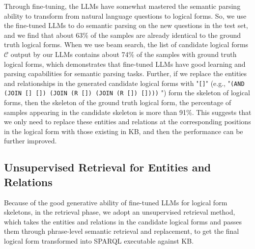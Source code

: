 \documentclass{article} \usepackage{iclr2024_conference,times}
\begin{document}
Through fine-tuning, the LLMs have somewhat mastered the semantic parsing ability to transform from natural language questions to logical forms. So, we use the fine-tuned LLMs to do semantic parsing on the new questions in the test set, and we find that about 63\% of the samples are already identical to the ground truth logical forms. When we use beam search, the list of candidate logical forms $\mathcal{C}$ output by our LLMs contains about 74\% of the samples with ground truth logical forms, which demonstrates that fine-tuned LLMs have good learning and parsing capabilities for semantic parsing tasks. Further, if we replace the entities and relationships in the generated candidate logical forms with "\texttt{[]}" (e.g., "\texttt{(AND (JOIN [] []) (JOIN (R []) (JOIN (R []) [])))} ") form the skeleton of logical forms, then the skeleton of the ground truth logical form, the percentage of samples appearing in the candidate skeleton is more than 91\%. This suggests that we only need to replace these entities and relations at the corresponding positions in the logical form with those existing in KB, and then the performance can be further improved.

\subsection{Unsupervised Retrieval for Entities and Relations}

Because of the good generative ability of fine-tuned LLMs for logical form skeletons, in the retrieval phase, we adopt an unsupervised retrieval method, which takes the entities and relations in the candidate logical forms and passes them through phrase-level semantic retrieval and replacement, to get the final logical form transformed into SPARQL executable against KB.
\end{document}

